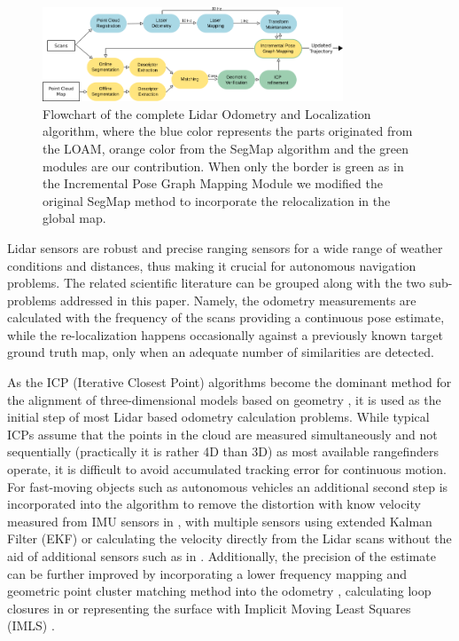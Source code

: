 \documentclass[letterpaper, 10 pt, conference]{ieeeconf}  %
\begin{document}
\begin{figure}[!h]
\centerline{\includegraphics[width=0.8\textwidth]{figures/lol_flowchart_5.png}}\par
\caption{Flowchart of the complete Lidar Odometry and Localization algorithm, where the blue color represents the parts originated from the LOAM, orange color from the SegMap algorithm and the green modules are our contribution. When only the border is green as in the Incremental Pose Graph Mapping Module we modified the original SegMap method to incorporate the relocalization in the global map.}
\label{fig:loam-segmap_flowchart}
\end{figure}

Lidar sensors are robust and precise ranging sensors for a wide range of weather conditions and distances, thus making it crucial for autonomous navigation problems. 
The related scientific literature can be grouped along with the two sub-problems addressed in this paper. Namely, the odometry measurements are calculated with the frequency of the scans providing a continuous pose estimate, while the re-localization happens occasionally against a previously known target ground truth map, only when an adequate number of similarities are detected.

As the ICP (Iterative Closest Point) algorithms become the dominant method for the alignment of three-dimensional models based on geometry \cite{essential_icp}, it is used as the initial step of most Lidar based odometry calculation problems. While typical ICPs assume that the points in the cloud are measured simultaneously and not sequentially (practically it is rather 4D than 3D) as most available rangefinders operate, it is difficult to avoid accumulated tracking error for continuous motion. For fast-moving objects such as autonomous vehicles an additional second step is incorporated into the algorithm to remove the distortion with know velocity measured from IMU sensors in \cite{imu_icp}, with multiple sensors using extended Kalman Filter (EKF) \cite{ekf_icp} or calculating the velocity directly from the Lidar scans without the aid of additional sensors such as in \cite{vicp}. Additionally, the precision of the estimate can be further improved by incorporating a lower frequency mapping and geometric point cluster matching method into the odometry \cite{zlot}, calculating loop closures in \cite{bosse} or representing the surface with Implicit Moving Least Squares (IMLS) \cite{imls_icp}. 
\end{document}
